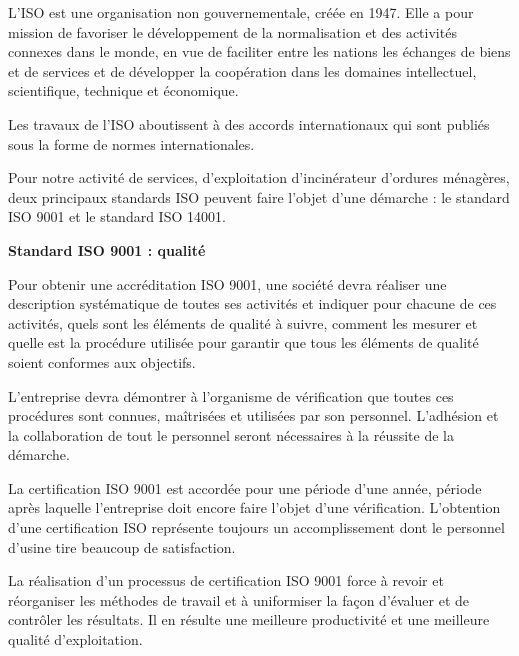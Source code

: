 L’ISO est une organisation non gouvernementale, créée en 1947. Elle a pour mission de favoriser le développement de la normalisation et des activités connexes dans le monde, en vue de faciliter entre les nations les échanges de biens et de services et de développer la coopération dans les domaines intellectuel, scientifique, technique et économique.
\vspace{0.3cm} 

Les travaux de l’ISO aboutissent à des accords internationaux qui sont publiés sous la forme de normes internationales.
\vspace{0.3cm} 

Pour notre activité de services, d’exploitation d’incinérateur d’ordures ménagères, deux principaux standards ISO peuvent faire l’objet d’une démarche : le standard ISO 9001 et le standard ISO 14001.


\vspace{0.3cm}
\textbf{Standard ISO 9001 : qualité}
\vspace{0.3cm}


Pour obtenir une accréditation ISO 9001, une société devra réaliser une description systématique de toutes ses activités et indiquer pour chacune de ces activités, quels sont les éléments de qualité à suivre, comment les mesurer et quelle est la procédure utilisée pour garantir que tous les éléments de qualité soient conformes aux objectifs. \vspace{0.3cm} 

L’entreprise devra démontrer à l’organisme de vérification que toutes ces procédures sont connues, maîtrisées et utilisées par son personnel. L’adhésion et la collaboration de tout le personnel seront nécessaires à la réussite de la démarche.
\vspace{0.3cm} 

La certification ISO 9001 est accordée pour une période d’une année, période après laquelle l’entreprise doit encore faire l’objet d’une vérification. L’obtention d’une certification ISO représente toujours un accomplissement dont le personnel d’usine tire beaucoup de satisfaction.
\vspace{0.3cm} 

La réalisation d’un processus de certification ISO 9001 force à revoir et réorganiser les méthodes de travail et à uniformiser la façon d’évaluer et de contrôler les résultats. Il en résulte une meilleure productivité et une meilleure qualité d’exploitation.


\vspace{0.3cm}

